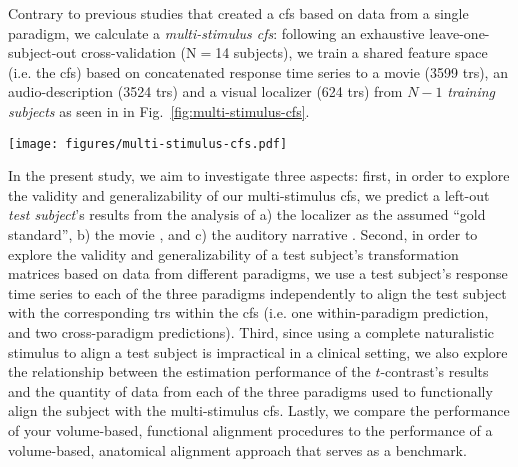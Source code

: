 Contrary to previous studies \citep[e.g.][]{jiahui2020predicting,
guntupalli2016model, haxby2011common} that created a \ac{cfs} based on data from
a single paradigm, we calculate a \textit{multi-stimulus \ac{cfs}}:
following an exhaustive leave-one-subject-out cross-validation (N$=$14
subjects), we train a shared feature space (i.e. the \ac{cfs}) based on
concatenated response time series to a movie (3599 \acp{tr}), an
audio-description (3524 \acp{tr}) and a visual localizer (624 \acp{tr}) from
$N-1$ \textit{training subjects} as seen in in
Fig.~\ref{fig:multi-stimulus-cfs}.


\begin{figure*}[tbp]
\centering
    \texttt{[image: figures/multi-stimulus-cfs.pdf]}
    \caption{
    \textbf{Overview of the shared response model.
    }
    For each fold of the leave-one-subject-out cross-validation, each training
    subject's response time series from the movie (3599 \acp{tr}), the movie's
    audio-description (3524 \acp{tr}), and the visual localizer (624 \acp{tr})
    were concatenated to serve as input for the \ac{srm} algorithm.
    From these response time series represented as matrix $X_{n}$ ({$v$} voxels
    by $t$ time points), the algorithm calculates the common functional
    space (CFS) $C$ ($k$ shared features by $t$ time points) and
    subject-specific, transformation matrices $W_{n}$
    ($v$ voxels by $k$ shared features) with orthonormal columns
    ($W_{n}^{T}W_{n}=I_{k}$).
} \label{fig:multi-stimulus-cfs} \end{figure*}


In the present study, we aim to investigate three aspects:
first, in order to explore the validity and generalizability of our
multi-stimulus \ac{cfs}, we predict a left-out \textit{test subject}'s results
from the analysis of
%
a) the localizer \citep{sengupta2016extension} as the assumed ``gold standard'',
%
b) the movie \citep{haeusler2022processing}, and
%
c) the auditory narrative \citep{haeusler2022processing}.
Second, in order to explore the validity and generalizability of a test
subject's transformation matrices based on data from different paradigms, we use
a test subject's response time series to each of the three paradigms
independently to align the test subject with the corresponding \acp{tr} within
the \ac{cfs} (i.e. one within-paradigm prediction, and two cross-paradigm
predictions).
Third, since using a complete naturalistic stimulus to align a test subject is
impractical in a clinical setting, we also explore the relationship between the
estimation performance of the $t$-contrast's results and the quantity of data
from each of the three paradigms used to functionally align the subject with the
multi-stimulus \ac{cfs}.
Lastly, we compare the performance of your volume-based, functional alignment
procedures to the performance of a volume-based, anatomical alignment approach
that serves as a benchmark.




